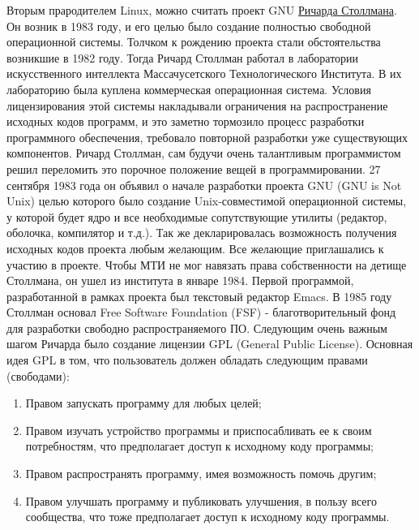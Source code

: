 \documentclass[bachelor, och, referat, times]{SCWorks}
\begin{document}
\par Вторым прародителем Linux, можно считать 
проект GNU 
\href{https://ru.wikipedia.org/wiki/\%D0\%A1\%D1\
BB\%D0\%BC\%D0\%B0\%D0\%BD,\_\%D0\%A0\%D0\%B8\%D1
\%87\%D0\%B0\%D1\%80\%D0
\%B4\_\%D0\%9C\%D1\%8D\%D1\%82\%D1\%82\%D1\%8C\%D1
\%8E}{Ричарда 
Столлмана}. Он возник в 1983 году, и его целью было 
создание полностью 
свободной операционной системы. Толчком к рождению 
проекта стали 
обстоятельства возникшие в 1982 году. Тогда Ричард 
Столлман работал в 
лаборатории искусственного интеллекта 
Массачусетского Технологического 
Института. В их лабораторию была куплена 
коммерческая операционная 
система. Условия лицензирования этой системы 
накладывали ограничения на 
распространение исходных кодов программ, и это 
заметно тормозило процесс 
разработки программного обеспечения, требовало 
повторной разработки уже 
существующих компонентов. Ричард Столлман, сам 
будучи очень талантливым 
программистом решил переломить это порочное 
положение вещей в 
программировании. 27 сентября 1983 года он объявил 
о начале разработки 
проекта GNU (GNU is Not Unix) целью которого было 
создание 
Unix-совместимой операционной системы, у которой 
будет ядро и все 
необходимые сопутствующие утилиты (редактор, 
оболочка, компилятор и т.д.).
Так же декларировалась возможность получения 
исходных кодов проекта любым 
желающим. Все желающие приглашались к участию в 
проекте. Чтобы МТИ не мог 
навязать права собственности на детище Столлмана, 
он ушел из института в 
январе 1984. Первой программой, разработанной в 
рамках проекта был 
текстовый редактор Emacs. В 1985 году Столлман 
основал Free Software 
Foundation (FSF) - благотворительный фонд для 
разработки свободно 
распространяемого ПО. Следующим очень важным шагом 
Ричарда было создание 
лицензии GPL (General Public License). Основная 
идея GPL в том, что 
пользователь должен обладать следующим правами 
(свободами):
	\begin{enumerate}
		\item Правом запускать программу для любых 
		целей;
		\item Правом изучать устройство программы и 
		приспосабливать ее к 
		своим потребностям, что предполагает доступ 
		к исходному коду 
		программы;
		\item Правом распространять программу, имея 
		возможность помочь 
		другим;
		\item Правом улучшать программу и 
		публиковать улучшения, в пользу 
		всего сообщества, что тоже предполагает 
		доступ к исходному коду 
		программы.
	\end{enumerate}
	
\end{document}
